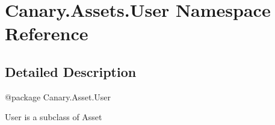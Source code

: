 \hypertarget{namespace_canary_1_1_assets_1_1_user}{\section{Canary.\-Assets.\-User Namespace Reference}
\label{namespace_canary_1_1_assets_1_1_user}
}


\subsection{Detailed Description}
\begin{DoxyVerb}@package Canary.Asset.User

User is a subclass of Asset
\end{DoxyVerb}
 